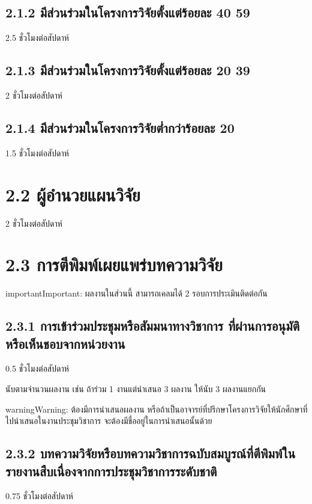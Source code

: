 \documentclass[a4paper,12pt,english]{sphinxmanual}
\begin{document}
\subsection{2.1.2 มีส่วนร่วมในโครงการวิจัยตั้งแต่ร้อยละ 40 \sphinxhyphen{} 59}
\label{\detokenize{2research:id6}}
2.5 ชั่วโมงต่อสัปดาห์


\subsection{2.1.3 มีส่วนร่วมในโครงการวิจัยตั้งแต่ร้อยละ 20 \sphinxhyphen{} 39}
\label{\detokenize{2research:id7}}
2 ชั่วโมงต่อสัปดาห์


\subsection{2.1.4 มีส่วนร่วมในโครงการวิจัยต่ำกว่าร้อยละ 20}
\label{\detokenize{2research:id8}}
1.5 ชั่วโมงต่อสัปดาห์


\section{2.2 ผู้อำนวยแผนวิจัย}
\label{\detokenize{2research:id9}}
2 ชั่วโมงต่อสัปดาห์


\section{2.3 การตีพิมพ์เผยแพร่บทความวิจัย}
\label{\detokenize{2research:id10}}\label{\detokenize{2research:id11}}
\begin{sphinxadmonition}{important}{Important:}
ผลงานในส่วนนี้ สามารถเคลมได้ 2 รอบการประเมินติดต่อกัน
\end{sphinxadmonition}


\subsection{2.3.1 การเข้าร่วมประชุมหรือสัมมนาทางวิชาการ ที่ผ่านการอนุมัติหรือเห็นชอบจากหน่วยงาน}
\label{\detokenize{2research:id12}}
0.5 ชั่วโมงต่อสัปดาห์

นับตามจำนวนผลงาน เช่น ถ้าร่วม 1 งานแต่นำเสนอ 3 ผลงาน ให้นับ 3 ผลงานแยกกัน

\begin{sphinxadmonition}{warning}{Warning:}
ต้องมีการนำเสนอผลงาน หรือถ้าเป็นอาจารย์ที่ปรึกษาโครงการวิจัยให้นักศึกษาที่ไปนำเสนอในงานประชุมวิชาการ จะต้องมีชื่ออยู่ในการนำเสนอนั้นด้วย
\end{sphinxadmonition}


\subsection{2.3.2 บทความวิจัยหรือบทความวิชาการฉบับสมบูรณ์ที่ตีพิมพ์ในรายงานสืบเนื่องจากการประชุมวิชาการระดับชาติ}
\label{\detokenize{2research:id13}}
0.75 ชั่วโมงต่อสัปดาห์
\end{document}
